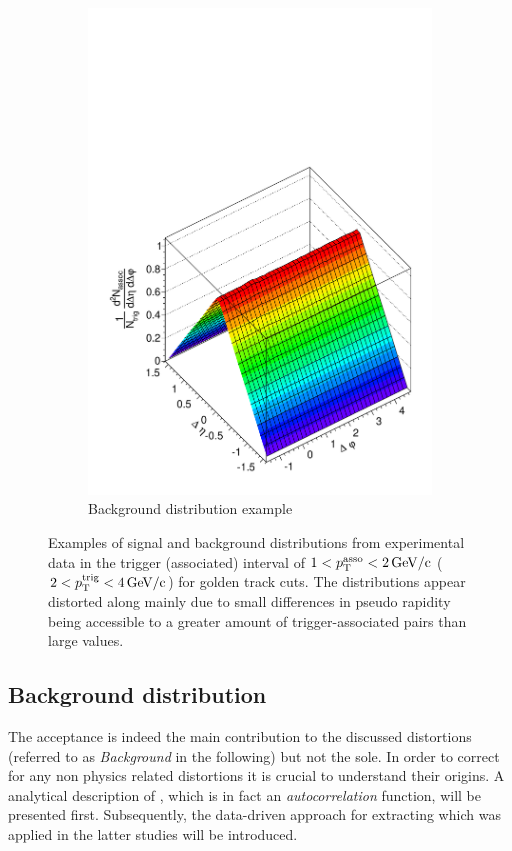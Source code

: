\begin{figure}[htbp]
\begin{subfigure}[b]{0.5\textwidth}
    \includegraphics[width=\textwidth]{figures/example_background.pdf}
    \caption{Background distribution example}
    \label{fig:example_backgroun}
  \end{subfigure}
  \caption[Examples of signal and background distributions from experimental data.]{Examples of signal and background distributions from experimental data in the trigger (associated) interval of $1 < p_{\text{T}}^{\text{asso}} < \SI{2}{GeV/c}$ ($2 < p_{\text{T}}^{\text{trig}} < \SI{4}{GeV/c}$) for golden track cuts. The distributions appear distorted along \deta mainly due to small differences in pseudo rapidity being accessible to a greater amount of trigger-associated pairs than large \deta values.}
  \label{fig:example_signal_background}
\end{figure}


\subsection{Background distribution}
\label{sec:background_distribution}
The acceptance is indeed the main contribution to the discussed distortions (referred to as \emph{Background} \B in the following) but not the sole. In order to correct \Sig for any non physics related distortions it is crucial to understand their origins. A analytical description of \B, which is in fact an \emph{autocorrelation} function, will be presented first. Subsequently, the data-driven approach for extracting \B which was applied in the latter studies will be introduced. 

